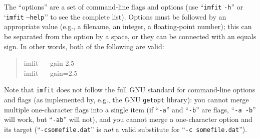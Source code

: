 \documentclass[10pt]{article}
\newcommand{\imfit}{\texttt{imfit}}
\begin{document}
The ``options'' are a set of command-line flags and options (use ``\imfit{} \texttt{-h}''
or `\imfit{} \texttt{--help}'' to see the complete list). Options must be followed by
an appropriate value (e.g., a filename, an integer, a floating-point number); this can
be separated from the option by a space, or they can be connected with an equals sign.
In other words, both of the following are valid:
\begin{quote}
imfit ~ \texttt{--}gain 2.5 \\
imfit ~ \texttt{--}gain=2.5
\end{quote}
Note that \imfit{} does not follow the full GNU standard for
command-line options and flags (as implemented by, e.g., the GNU
\texttt{getopt} library): you cannot merge multiple one-character flags
into a single item (if ``\texttt{-a}'' and ``\texttt{-b}'' are flags,
``\texttt{-a -b}'' will work, but ``\texttt{-ab}'' will not), and you
cannot merge a one-character option and its target
(``\texttt{-csomefile.dat}'' is \textit{not} a valid substitute for
``\texttt{-c somefile.dat}'').

\bigskip
\end{document}
